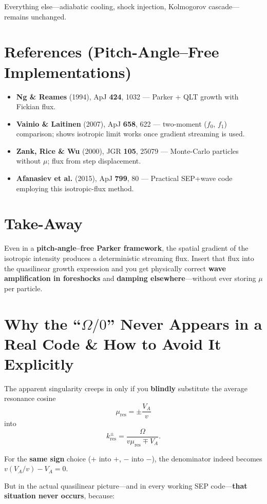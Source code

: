 Everything else—adiabatic cooling, shock injection, Kolmogorov cascade—remains unchanged.

\section*{References (Pitch-Angle--Free Implementations)}

\begin{itemize}
\item \textbf{Ng \& Reames} (1994), ApJ \textbf{424}, 1032 — Parker + QLT growth with Fickian flux.
\item \textbf{Vainio \& Laitinen} (2007), ApJ \textbf{658}, 622 — two-moment ($f_0$, $f_1$) comparison; shows isotropic limit works once gradient streaming is used.
\item \textbf{Zank, Rice \& Wu} (2000), JGR \textbf{105}, 25079 — Monte-Carlo particles without $\mu$; flux from step displacement.
\item \textbf{Afanasiev et al.} (2015), ApJ \textbf{799}, 80 — Practical SEP+wave code employing this isotropic-flux method.
\end{itemize}

\section*{Take-Away}

Even in a \textbf{pitch-angle--free Parker framework}, the spatial gradient of the isotropic intensity produces a deterministic streaming flux. Insert that flux into the quasilinear growth expression and you get physically correct \textbf{wave amplification in foreshocks} and \textbf{damping elsewhere}—without ever storing $\mu$ per particle.

\section*{Why the ``$\Omega / 0$'' Never Appears in a Real Code \& How to Avoid It Explicitly}

The apparent singularity creeps in only if you \textbf{blindly} substitute the average resonance cosine
\[
\mu_{\text{res}} = \pm \frac{V_A}{v} \tag{1}
\]
into
\[
k_{\text{res}}^{\pm} = \frac{\Omega}{v \mu_{\text{res}} \mp V_A}. \tag{2}
\]

For the \textbf{same sign} choice ($+$ into $+$, $-$ into $-$), the denominator indeed becomes $v (V_A / v) - V_A = 0$. 

But in the actual quasilinear picture—and in every working SEP code—\textbf{that situation never occurs}, because:

